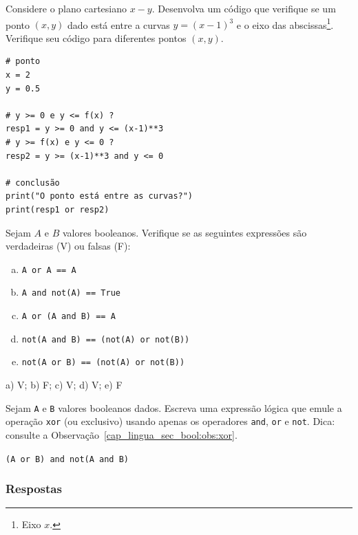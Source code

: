 \begin{exer}
  Considere o plano cartesiano $x-y$. Desenvolva um código que verifique se um ponto $(x, y)$ dado está entre a curvas $y = (x-1)^3$ e o eixo das abscissas\footnote{Eixo $x$.}. Verifique seu código para diferentes pontos $(x, y)$.
\end{exer}
\begin{resp}

\begin{lstlisting}
# ponto
x = 2
y = 0.5

# y >= 0 e y <= f(x) ?
resp1 = y >= 0 and y <= (x-1)**3
# y >= f(x) e y <= 0 ?
resp2 = y >= (x-1)**3 and y <= 0

# conclusão
print("O ponto está entre as curvas?")
print(resp1 or resp2)
\end{lstlisting}

\end{resp}

\begin{exer}
  Sejam $A$ e $B$ valores booleanos. Verifique se as seguintes expressões são verdadeiras (V) ou falsas (F):
  \begin{enumerate}[a)]
  \item \lstinline+A or A == A+
  \item \lstinline+A and not(A) == True+
  \item \lstinline+A or (A and B) == A+
  \item \lstinline+not(A and B) == (not(A) or not(B))+
  \item \lstinline+not(A or B) == (not(A) or not(B))+
  \end{enumerate}
\end{exer}
\begin{resp}
  a) V; b) F; c) V; d) V; e) F
\end{resp}

\begin{exer}\label{cap_lingua_sec_bool:exer:xor}
  Sejam \lstinline+A+ e \lstinline+B+ valores booleanos dados. Escreva uma expressão lógica que emule a operação \lstinline+xor+ (ou exclusivo) usando apenas os operadores \lstinline+and+, \lstinline+or+ e \lstinline+not+. Dica: consulte a Observação~\ref{cap_lingua_sec_bool:obs:xor}.
\end{exer}
\begin{resp}
  \lstinline+(A or B) and not(A and B)+
\end{resp}

\ifisbook
\subsubsection{Respostas}
\shipoutAnswer
\fi

